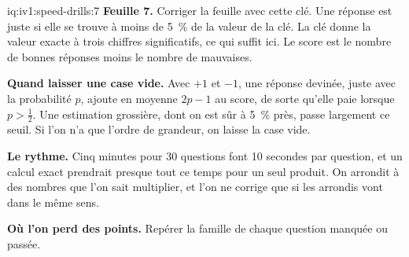 \begin{solution}{iq:iv1:speed-drills:7}
\textbf{Feuille 7.} Corriger la feuille avec cette clé. Une réponse est juste si elle se trouve à moins de 5~\% de la valeur de la clé. La clé donne la valeur exacte à trois chiffres significatifs, ce qui suffit ici. Le score est le nombre de bonnes réponses moins le nombre de mauvaises.
\par\nopagebreak


\textbf{Quand laisser une case vide.} Avec $+1$ et $-1$, une réponse devinée, juste avec la probabilité $p$, ajoute en moyenne $2p - 1$ au score, de sorte qu'elle paie lorsque $p > \tfrac12$. Une estimation grossière, dont on est sûr à 5~\% près, passe largement ce seuil. Si l'on n'a que l'ordre de grandeur, on laisse la case vide.

\textbf{Le rythme.} Cinq minutes pour 30 questions font 10 secondes par question, et un calcul exact prendrait presque tout ce temps pour un seul produit. On arrondit à des nombres que l'on sait multiplier, et l'on ne corrige que si les arrondis vont dans le même sens.

\textbf{Où l'on perd des points.} Repérer la famille de chaque question manquée ou passée.


\end{solution}

